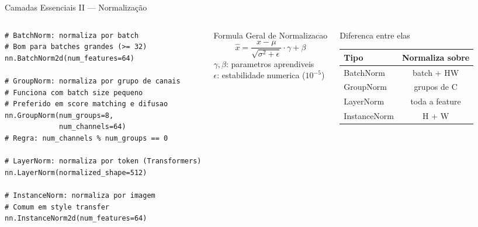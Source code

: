 \documentclass[aspectratio=169, 10pt]{beamer}
\begin{document}
\begin{frame}[fragile]{Camadas Essenciais II — Normalização}
\begin{columns}
\begin{lstlisting}
# BatchNorm: normaliza por batch
# Bom para batches grandes (>= 32)
nn.BatchNorm2d(num_features=64)

# GroupNorm: normaliza por grupo de canais
# Funciona com batch size pequeno
# Preferido em score matching e difusao
nn.GroupNorm(num_groups=8,
             num_channels=64)
# Regra: num_channels % num_groups == 0

# LayerNorm: normaliza por token (Transformers)
nn.LayerNorm(normalized_shape=512)

# InstanceNorm: normaliza por imagem
# Comum em style transfer
nn.InstanceNorm2d(num_features=64)
\end{lstlisting}

\begin{block}{Formula Geral de Normalizacao}
  \[\hat{x} = \frac{x - \mu}{\sqrt{\sigma^2 + \epsilon}} \cdot \gamma + \beta\]
  $\gamma, \beta$: parametros aprendiveis\\
  $\epsilon$: estabilidade numerica ($10^{-5}$)
\end{block}
\vspace{0.3em}
\begin{block}{Diferenca entre elas}
  \centering
  \begin{tabular}{lc}
    \toprule
    Tipo & Normaliza sobre \\
    \midrule
    BatchNorm & batch + HW \\
    GroupNorm & grupos de C \\
    LayerNorm & toda a feature \\
    InstanceNorm & H + W \\
    \bottomrule
  \end{tabular}
\end{block}
\end{columns}
\end{frame}

\end{document}
